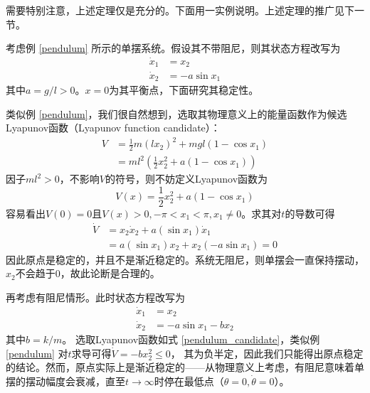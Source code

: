 需要特别注意，上述定理仅是充分的。下面用一实例说明。上述定理的推广见下一节。
\enlargethispage{1em}
\begin{example}[利用Lyapunov稳定性定理判别单摆系统稳定性]\label{suff_lyapunov}
  考虑例 \ref{pendulum} 所示的单摆系统。假设其不带阻尼，则其状态方程改写为
  \begin{equation}\label{nodamp}
    \begin{aligned}
      \dot{x}_1&=x_2\\
      \dot{x}_2&=-a\sin x_1
    \end{aligned}
  \end{equation}
  其中$a=g/l>0$。$x=0$为其平衡点，下面研究其稳定性。

  类似例 \ref{pendulum}，我们很自然想到，选取其物理意义上的能量函数作为候选Lyapunov函数（Lyapunov function candidate）：
  \begin{align*}
    V&=\frac{1}{2}m(lx_2)^2+mgl(1-\cos x_1)\\
    &=ml^2\left(\frac{1}{2}x_2^2+a(1-\cos x_1)\right)
  \end{align*}
  因子$ml^2>0$，不影响$V$的符号，则不妨定义Lyapunov函数为\begin{equation}\label{pendulum_candidate}
  V(x)=\frac{1}{2}x_2^2+a(1-\cos x_1)
\end{equation}
容易看出$V(0)=0$且$V(x)>0,-\pi<x_1<\pi,x_1\ne 0$。求其对$t$的导数可得\begin{align*}
  \dot{V}&=x_2\dot{x}_2+a(\sin x_1)\dot{x}_1\\
  &=a(\sin x_1){x}_2+x_2(-a\sin x_1)=0
\end{align*}
因此原点是稳定的，并且不是渐近稳定的。系统无阻尼，则单摆会一直保持摆动，$x_2$不会趋于$0$，故此论断是合理的。

再考虑有阻尼情形。此时状态方程改写为
  \begin{equation}\label{damped}
    \begin{aligned}
      \dot{x}_1&=x_2\\
      \dot{x}_2&=-a\sin x_1-bx_2
    \end{aligned}
  \end{equation}
其中$b=k/m$。
选取Lyapunov函数如式 \eqref{pendulum_candidate}，类似例 \ref{pendulum} 对$t$求导可得$\dot{V}=-bx_2^2\le 0$，
其为负半定，因此我们只能得出原点稳定的结论。然而，原点实际上是渐近稳定的——从物理意义上考虑，有阻尼意味着单摆的摆动幅度会衰减，直至$t\to\infty$时停在最低点（$\theta=0,\dot{\theta}=0$）。


\end{example}
